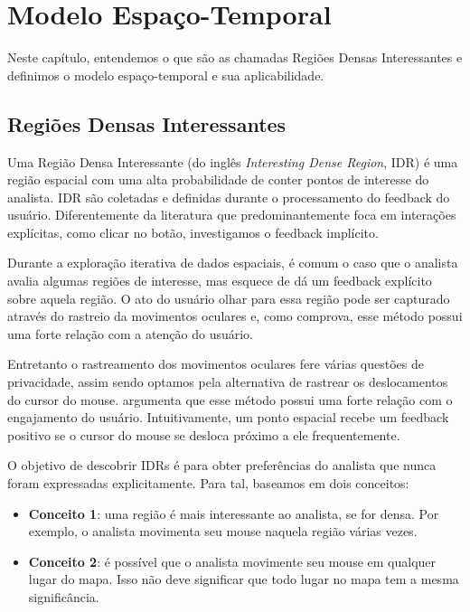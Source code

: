 \chapter{Modelo Espaço-Temporal}
\label{chap:modelo}



Neste capítulo, entendemos o que são as chamadas Regiões Densas Interessantes e definimos o modelo espaço-temporal e sua aplicabilidade.

\section{Regiões Densas Interessantes}


Uma Região Densa Interessante (do inglês {\em Interesting Dense Region}, IDR) é uma região espacial com uma alta probabilidade de conter pontos de interesse do analista. IDR são coletadas e definidas durante o processamento do feedback do usuário. Diferentemente da literatura que predominantemente foca em interações explícitas, como clicar no botão, investigamos o feedback implícito.

Durante a exploração iterativa de dados espaciais, é comum o caso que o analista avalia algumas regiões de interesse, mas esquece de dá um feedback explícito sobre aquela região. O ato do usuário olhar para essa região pode ser capturado através do rastreio da movimentos oculares e, como  comprova, esse método possui uma forte relação com a atenção do usuário.

Entretanto o rastreamento dos movimentos oculares fere várias questões de privacidade, assim sendo optamos pela alternativa de rastrear os deslocamentos do cursor do mouse.  argumenta que esse método possui uma forte relação com o engajamento do usuário. Intuitivamente, um ponto espacial recebe um feedback positivo se o cursor do mouse se desloca próximo a ele frequentemente.

O objetivo de descobrir IDRs é para obter preferências do analista que nunca foram expressadas explicitamente. Para tal, baseamos em dois conceitos:

\begin{itemize}
	\item \textbf{Conceito 1}: uma região é mais interessante ao analista, se for densa. Por exemplo, o analista movimenta seu mouse naquela região várias vezes.
	\item \textbf{Conceito 2}: é possível que o analista movimente seu mouse em qualquer lugar do mapa. Isso não deve significar que todo lugar no mapa tem a mesma significância.
\end{itemize}

